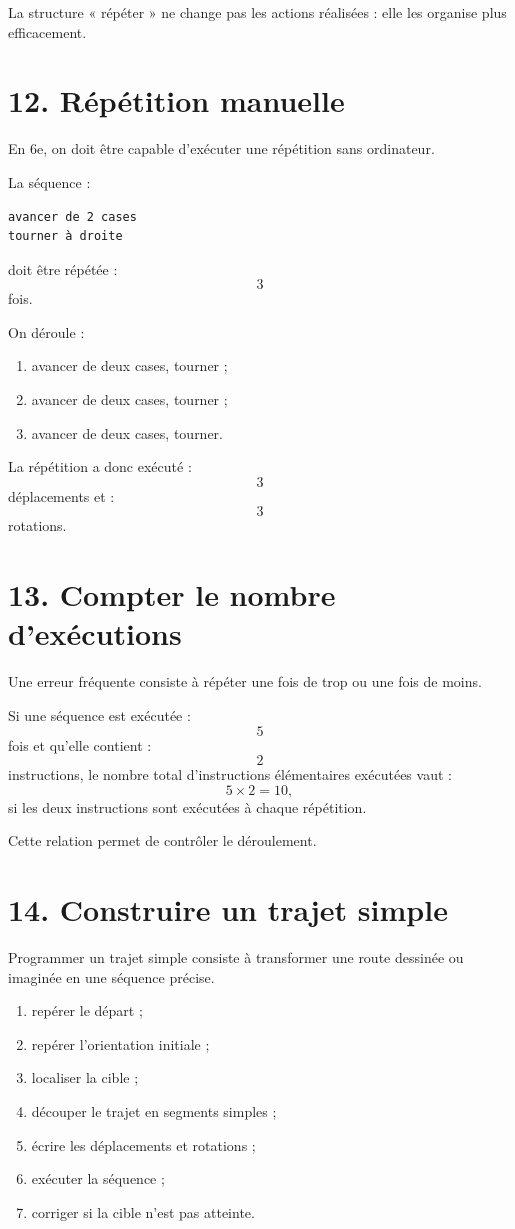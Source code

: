 La structure « répéter » ne change pas les actions réalisées : elle les organise plus efficacement.

\section{12. Répétition manuelle}

En 6e, on doit être capable d'exécuter une répétition sans ordinateur.

\begin{exemple}
La séquence :
\begin{verbatim}
avancer de 2 cases
tourner à droite
\end{verbatim}
doit être répétée :
\[
3
\]
fois.

On déroule :
\begin{enumerate}
\item avancer de deux cases, tourner ;
\item avancer de deux cases, tourner ;
\item avancer de deux cases, tourner.
\end{enumerate}

La répétition a donc exécuté :
\[
3
\]
déplacements et :
\[
3
\]
rotations.
\end{exemple}

\section{13. Compter le nombre d'exécutions}

Une erreur fréquente consiste à répéter une fois de trop ou une fois de moins.

Si une séquence est exécutée :
\[
5
\]
fois et qu'elle contient :
\[
2
\]
instructions, le nombre total d'instructions élémentaires exécutées vaut :
\[
5\times2=10,
\]
si les deux instructions sont exécutées à chaque répétition.

Cette relation permet de contrôler le déroulement.

\section{14. Construire un trajet simple}

Programmer un trajet simple consiste à transformer une route dessinée ou imaginée en une séquence précise.

\begin{methode}
\begin{enumerate}
\item repérer le départ ;
\item repérer l'orientation initiale ;
\item localiser la cible ;
\item découper le trajet en segments simples ;
\item écrire les déplacements et rotations ;
\item exécuter la séquence ;
\item corriger si la cible n'est pas atteinte.
\end{enumerate}
\end{methode}

